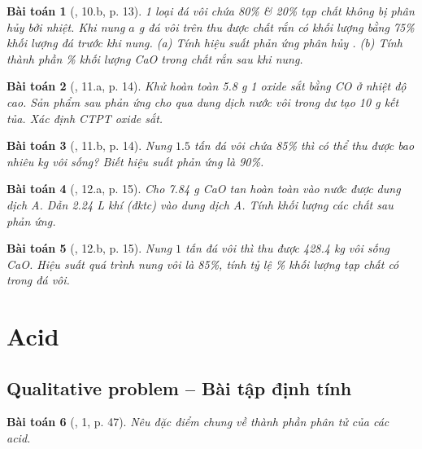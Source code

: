 \documentclass{article}
\newtheorem{baitoan}{Bài toán}
\begin{document}
\begin{baitoan}[\cite{An_350_BT_Hoa_Hoc_9}, 10.b, p. 13]
	1 loại đá vôi chứa \emph{80\% } \& \emph{20\%} tạp chất không bị phân hủy bởi nhiệt. Khi nung $a$ \emph{g} đá vôi trên thu được chất rắn có khối lượng bằng \emph{75\%} khối lượng đá trước khi nung. (a) Tính hiệu suất phản ứng phân hủy \emph{}. (b) Tính thành phần \% khối lượng \emph{CaO} trong chất rắn sau khi nung.
\end{baitoan}

\begin{baitoan}[\cite{An_350_BT_Hoa_Hoc_9}, 11.a, p. 14]
	Khử hoàn toàn \emph{5.8 g} 1 oxide sắt bằng \emph{CO} ở nhiệt độ cao. Sản phẩm sau phản ứng cho qua dung dịch nước vôi trong dư tạo \emph{10 g} kết tủa. Xác định CTPT oxide sắt.
\end{baitoan}

\begin{baitoan}[\cite{An_350_BT_Hoa_Hoc_9}, 11.b, p. 14]
	Nung $1.5$ tấn đá vôi chứa \emph{85\% } thì có thể thu được bao nhiêu \emph{kg} vôi sống? Biết hiệu suất phản ứng là \emph{90\%}.
\end{baitoan}

\begin{baitoan}[\cite{An_350_BT_Hoa_Hoc_9}, 12.a, p. 15]
	Cho \emph{7.84 g CaO} tan hoàn toàn vào nước được dung dịch A. Dẫn \emph{2.24 L} khí \emph{} (đktc) vào dung dịch A. Tính khối lượng các chất sau phản ứng.
\end{baitoan}

\begin{baitoan}[\cite{An_350_BT_Hoa_Hoc_9}, 12.b, p. 15]
	Nung $1$ tấn đá vôi thì thu được \emph{428.4 kg} vôi sống \emph{CaO}. Hiệu suất quá trình nung vôi là \emph{85\%}, tính tỷ lệ \emph{\%} khối lượng tạp chất có trong đá vôi.
\end{baitoan}


\section{Acid}

\subsection{Qualitative problem -- Bài tập định tính}

\begin{baitoan}[\cite{SGK_KHTN_8_Canh_Dieu}, 1, p. 47]
	Nêu đặc điểm chung về thành phần phân tử của các acid.
\end{baitoan}
\end{document}
